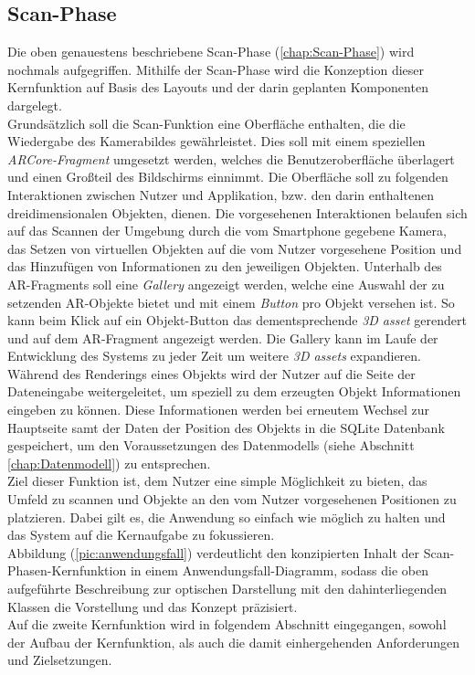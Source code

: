 \subsection*{Scan-Phase}
Die oben genauestens beschriebene Scan-Phase (\ref{chap:Scan-Phase}) wird nochmals aufgegriffen. 
Mithilfe der Scan-Phase wird die Konzeption dieser 
Kernfunktion auf Basis des Layouts und der darin geplanten Komponenten dargelegt.
\\ 
Grundsätzlich soll die Scan-Funktion eine Oberfläche enthalten, die die Wiedergabe des Kamerabildes gewährleistet. Dies soll mit einem 
speziellen \textit{ARCore-Fragment} umgesetzt werden, welches die Benutzeroberfläche überlagert und einen Großteil des Bildschirms einnimmt. 
Die Oberfläche soll zu folgenden Interaktionen zwischen Nutzer und Applikation, bzw. den darin enthaltenen dreidimensionalen Objekten, 
dienen. Die vorgesehenen Interaktionen belaufen sich auf das Scannen der Umgebung durch die vom Smartphone gegebene Kamera, das Setzen von 
virtuellen Objekten auf die vom Nutzer vorgesehene Position und das Hinzufügen von Informationen zu den jeweiligen Objekten. Unterhalb des 
\acs{AR}-Fragments soll eine \textit{Gallery} angezeigt werden, welche eine Auswahl der zu setzenden \acs{AR}-Objekte bietet und mit einem 
\textit{Button} pro Objekt versehen ist. So kann beim Klick auf ein Objekt-Button das dementsprechende \textit{3D asset} gerendert und auf 
dem \acs{AR}-Fragment angezeigt werden. Die Gallery kann im Laufe der Entwicklung des Systems zu jeder Zeit um weitere \textit{3D assets} 
expandieren. Während des Renderings eines Objekts wird der Nutzer auf die Seite der Dateneingabe weitergeleitet, um speziell zu dem 
erzeugten Objekt Informationen eingeben zu können. Diese Informationen werden bei erneutem Wechsel zur 
Hauptseite samt der Daten der Position des Objekts in die SQLite Datenbank gespeichert, um den Voraussetzungen des Datenmodells 
(siehe Abschnitt \ref{chap:Datenmodell}) zu entsprechen.
\\
Ziel dieser Funktion ist, dem Nutzer eine simple Möglichkeit zu bieten, das Umfeld zu scannen und Objekte an den vom Nutzer vorgesehenen 
Positionen zu platzieren. Dabei gilt es, die Anwendung so einfach wie möglich zu halten und das System auf die Kernaufgabe zu fokussieren.
\\ 
Abbildung (\ref{pic:anwendungsfall}) verdeutlicht den konzipierten Inhalt der Scan-Phasen-Kernfunktion in einem Anwendungsfall-Diagramm, 
sodass die oben aufgeführte Beschreibung zur optischen Darstellung mit den dahinterliegenden Klassen die Vorstellung und das Konzept präzisiert.
\\ 
\linebreak
Auf die zweite Kernfunktion wird in folgendem Abschnitt eingegangen, sowohl der Aufbau der Kernfunktion, als auch die damit einhergehenden 
Anforderungen und Zielsetzungen.

